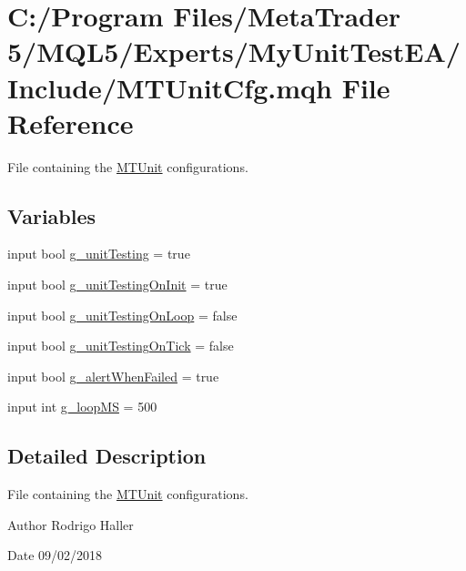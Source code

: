 \hypertarget{_m_t_unit_cfg_8mqh}{}\section{C\+:/\+Program Files/\+Meta\+Trader 5/\+M\+Q\+L5/\+Experts/\+My\+Unit\+Test\+E\+A/\+Include/\+M\+T\+Unit\+Cfg.mqh File Reference}
\label{_m_t_unit_cfg_8mqh}


File containing the \mbox{\hyperlink{class_m_t_unit}{M\+T\+Unit}} configurations.  


\subsection*{Variables}
\begin{DoxyCompactItemize}
\item 
input bool \mbox{\hyperlink{_m_t_unit_cfg_8mqh_a31abf9be05dbe668d70e868ad61aa0c6}{g\+\_\+unit\+Testing}} = true
\item 
input bool \mbox{\hyperlink{_m_t_unit_cfg_8mqh_ab232ce44ed0eb777193148652dd3f4ad}{g\+\_\+unit\+Testing\+On\+Init}} = true
\item 
input bool \mbox{\hyperlink{_m_t_unit_cfg_8mqh_a55b896e4657e5db89a5607a8465ffdca}{g\+\_\+unit\+Testing\+On\+Loop}} = false
\item 
input bool \mbox{\hyperlink{_m_t_unit_cfg_8mqh_a856d49e2751c35968dcc24bac5a190c1}{g\+\_\+unit\+Testing\+On\+Tick}} = false
\item 
input bool \mbox{\hyperlink{_m_t_unit_cfg_8mqh_afd4fbce07023b027115562cbfb557fbe}{g\+\_\+alert\+When\+Failed}} = true
\item 
input int \mbox{\hyperlink{_m_t_unit_cfg_8mqh_a2092542860cef1f04c0efd7a04ceac78}{g\+\_\+loop\+MS}} = 500
\end{DoxyCompactItemize}


\subsection{Detailed Description}
File containing the \mbox{\hyperlink{class_m_t_unit}{M\+T\+Unit}} configurations. 

\begin{DoxyAuthor}{Author}
Rodrigo Haller 
\end{DoxyAuthor}
\begin{DoxyDate}{Date}
09/02/2018 
\end{DoxyDate}


